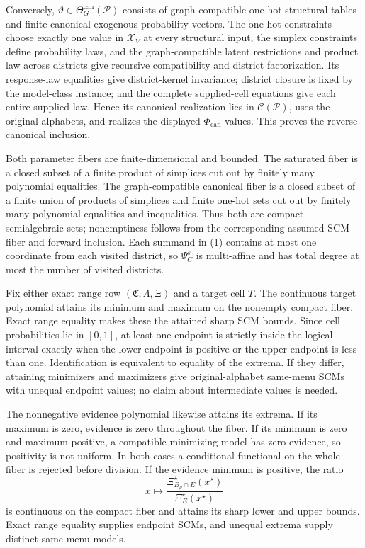 Conversely, \(\vartheta\in\Theta_G^{\mathrm{can}}(\mathcal P)\) consists of graph-compatible one-hot structural tables and finite canonical exogenous probability vectors.  The one-hot constraints choose exactly one value in \(\mathcal X_V\) at every structural input, the simplex constraints define probability laws, and the graph-compatible latent restrictions and product law across districts give recursive compatibility and district factorization.  Its response-law equalities give district-kernel invariance; district closure is fixed by the model-class instance; and the complete supplied-cell equations give each entire supplied law.  Hence its canonical realization lies in \(\mathcal C(\mathcal P)\), uses the original alphabets, and realizes the displayed \(\Phi_{\mathrm{can}}\)-values.  This proves the reverse canonical inclusion.

Both parameter fibers are finite-dimensional and bounded.  The saturated fiber is a closed subset of a finite product of simplices cut out by finitely many polynomial equalities.  The graph-compatible canonical fiber is a closed subset of a finite union of products of simplices and finite one-hot sets cut out by finitely many polynomial equalities and inequalities.  Thus both are compact semialgebraic sets; nonemptiness follows from the corresponding assumed SCM fiber and forward inclusion.  Each summand in (1) contains at most one coordinate from each visited district, so \(\Psi_C^s\) is multi-affine and has total degree at most the number of visited districts.

Fix either exact range row \((\mathfrak C,\Lambda,\Xi)\) and a target cell \(T\).  The continuous target polynomial attains its minimum and maximum on the nonempty compact fiber.  Exact range equality makes these the attained sharp SCM bounds.  Since cell probabilities lie in \([0,1]\), at least one endpoint is strictly inside the logical interval exactly when the lower endpoint is positive or the upper endpoint is less than one.  Identification is equivalent to equality of the extrema.  If they differ, attaining minimizers and maximizers give original-alphabet same-menu SCMs with unequal endpoint values; no claim about intermediate values is needed.

The nonnegative evidence polynomial likewise attains its extrema.  If its maximum is zero, evidence is zero throughout the fiber.  If its minimum is zero and maximum positive, a compatible minimizing model has zero evidence, so positivity is not uniform.  In both cases a conditional functional on the whole fiber is rejected before division.  If the evidence minimum is positive, the ratio
\[
x\longmapsto
\frac{\Xi_{B_\rho\cap E}^\star(x^\star)}{\Xi_E^\star(x^\star)}
\]
is continuous on the compact fiber and attains its sharp lower and upper bounds.  Exact range equality supplies endpoint SCMs, and unequal extrema supply distinct same-menu models.

